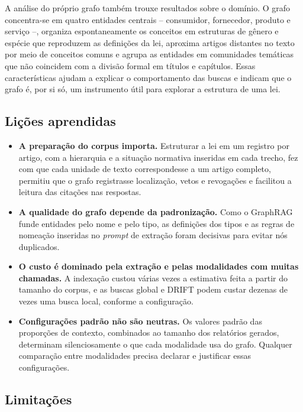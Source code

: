 A análise do próprio grafo também trouxe resultados sobre o domínio. O grafo concentra-se em quatro entidades centrais -- consumidor, fornecedor, produto e serviço --, organiza espontaneamente os conceitos em estruturas de gênero e espécie que reproduzem as definições da lei, aproxima artigos distantes no texto por meio de conceitos comuns e agrupa as entidades em comunidades temáticas que não coincidem com a divisão formal em títulos e capítulos. Essas características ajudam a explicar o comportamento das buscas e indicam que o grafo é, por si só, um instrumento útil para explorar a estrutura de uma lei.

\subsection{Lições aprendidas}
\label{sec-conclusoes-licoes}

\begin{itemize}
    \item \textbf{A preparação do corpus importa.} Estruturar a lei em um registro por artigo, com a hierarquia e a situação normativa inseridas em cada trecho, fez com que cada unidade de texto correspondesse a um artigo completo, permitiu que o grafo registrasse localização, vetos e revogações e facilitou a leitura das citações nas respostas.
    \item \textbf{A qualidade do grafo depende da padronização.} Como o GraphRAG funde entidades pelo nome e pelo tipo, as definições dos tipos e as regras de nomeação inseridas no \textit{prompt} de extração foram decisivas para evitar nós duplicados.
    \item \textbf{O custo é dominado pela extração e pelas modalidades com muitas chamadas.} A indexação custou várias vezes a estimativa feita a partir do tamanho do corpus, e as buscas global e DRIFT podem custar dezenas de vezes uma busca local, conforme a configuração.
    \item \textbf{Configurações padrão não são neutras.} Os valores padrão das proporções de contexto, combinados ao tamanho dos relatórios gerados, determinam silenciosamente o que cada modalidade usa do grafo. Qualquer comparação entre modalidades precisa declarar e justificar essas configurações.
\end{itemize}

\subsection{Limitações}
\label{sec-conclusoes-limitacoes}

